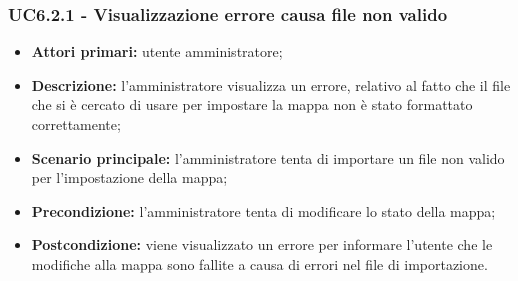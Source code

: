 \subsubsection{UC6.2.1 - Visualizzazione errore causa file non valido}
	\begin{itemize}
		\item \textbf{Attori primari:} utente amministratore;
		\item \textbf{Descrizione:} l'amministratore visualizza un errore, relativo al fatto che il file che si è cercato di usare per impostare la mappa non è stato formattato correttamente;
		\item \textbf{Scenario principale:} l'amministratore tenta di importare un file non valido per l'impostazione della mappa;
		\item \textbf{Precondizione:} l'amministratore tenta di modificare lo stato della mappa;
		\item \textbf{Postcondizione:} viene visualizzato un errore per informare l'utente che le modifiche alla mappa sono fallite a causa di errori nel file di importazione.
	\end{itemize}

